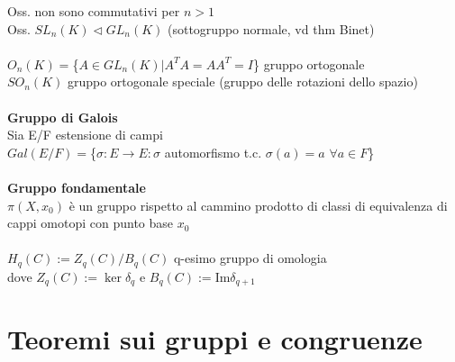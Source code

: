 \documentclass[10pt,a4paper]{article}
\begin{document}
Oss. non sono commutativi per $n>1$\\
Oss. $SL_n(K) \lhd GL_n(K)$ (sottogruppo normale, vd thm Binet)\\\\
$ O_n(K) = $\{$A \in GL_n(K) | A^TA = AA^T = I$\} gruppo ortogonale\\
$SO_n(K)$ gruppo ortogonale speciale (gruppo delle rotazioni dello spazio)\\\\
\textbf{Gruppo di Galois}\\
Sia E/F estensione di campi\\
$Gal(E/F) =$\{$\sigma: E \to E : \sigma$ automorfismo t.c. $\sigma(a) = a$ $ \forall a\in F$\}\\\\
\textbf{Gruppo fondamentale}\\
$\pi(X,x_0)$ è un gruppo rispetto al cammino prodotto di classi di equivalenza di cappi omotopi con punto base $x_0$\\\\
$H_q(C) := Z_q(C) / B_q(C)$ q-esimo gruppo di omologia\\
dove $Z_q(C) := \ker \delta_q $ e $ B_q(C) := $Im$\delta_{q+1}$
\newpage
\section{Teoremi sui gruppi e congruenze}
\end{document}
